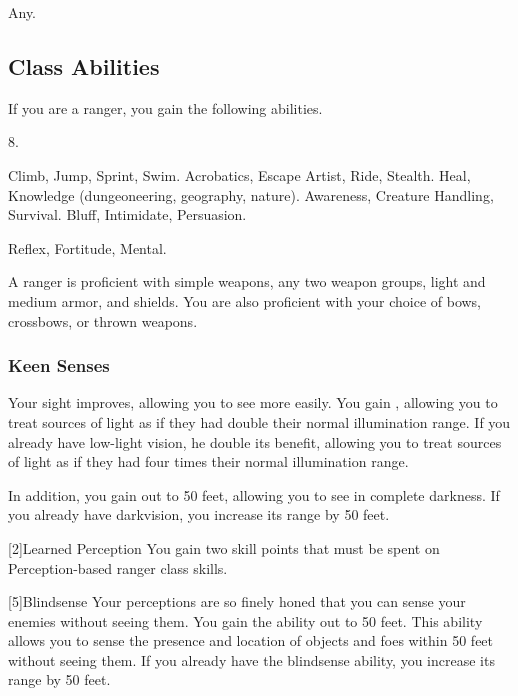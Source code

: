      Any.

    \subsection{Class Abilities}
        If you are a ranger, you gain the following abilities.

         8.

         Climb, Jump, Sprint, Swim.
         Acrobatics, Escape Artist, Ride, Stealth.
         Heal, Knowledge (dungeoneering, geography, nature).
         Awareness, Creature Handling, Survival.
         Bluff, Intimidate, Persuasion.

          Reflex,  Fortitude,  Mental.

        A ranger is proficient with simple weapons, any two weapon groups, light and medium armor, and shields.
        You are also proficient with your choice of bows, crossbows, or thrown weapons.

        \subsubsection{Keen Senses}
            Your sight improves, allowing you to see more easily.
            You gain , allowing you to treat sources of light as if they had double their normal illumination range.
            If you already have low-light vision, he double its benefit, allowing you to treat sources of light as if they had four times their normal illumination range.

            In addition, you gain  out to 50 feet, allowing you to see in complete darkness.
            If you already have darkvision, you increase its range by 50 feet.

            [2]{Learned Perception} You gain two skill points that must be spent on Perception-based ranger class skills.

            [5]{Blindsense}
            Your perceptions are so finely honed that you can sense your enemies without seeing them.
            You gain the  ability out to 50 feet.
            This ability allows you to sense the presence and location of objects and foes within 50 feet without seeing them.
            If you already have the blindsense ability, you increase its range by 50 feet.

